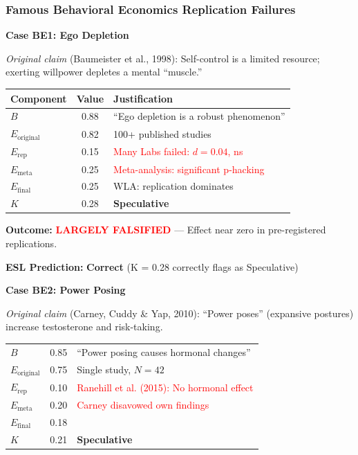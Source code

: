 \documentclass[11pt,a4paper]{article}
\begin{document}
\subsubsection{Famous Behavioral Economics Replication Failures}

\textbf{Case BE1: Ego Depletion}

\textit{Original claim} (Baumeister et al., 1998): Self-control is a limited resource; exerting willpower depletes a mental ``muscle.''

\begin{center}
\begin{tabular}{lcl}
\toprule
\textbf{Component} & \textbf{Value} & \textbf{Justification} \\
\midrule
$B$ & 0.88 & ``Ego depletion is a robust phenomenon'' \\
$E_{\text{original}}$ & 0.82 & 100+ published studies \\
$E_{\text{rep}}$ & 0.15 & \textcolor{red}{Many Labs failed: $d = 0.04$, ns} \\
$E_{\text{meta}}$ & 0.25 & \textcolor{red}{Meta-analysis: significant p-hacking} \\
\midrule
$E_{\text{final}}$ & 0.25 & WLA: replication dominates \\
$K$ & 0.28 & \textbf{Speculative} \\
\bottomrule
\end{tabular}
\end{center}

\textbf{Outcome:} \textcolor{red}{\textbf{LARGELY FALSIFIED}} --- Effect near zero in pre-registered replications.

\textbf{ESL Prediction:} \checkmark \textbf{Correct} (K = 0.28 correctly flags as Speculative)

\vspace{1em}

\textbf{Case BE2: Power Posing}

\textit{Original claim} (Carney, Cuddy \& Yap, 2010): ``Power poses'' (expansive postures) increase testosterone and risk-taking.

\begin{center}
\begin{tabular}{lcl}
\toprule
$B$ & 0.85 & ``Power posing causes hormonal changes'' \\
$E_{\text{original}}$ & 0.75 & Single study, $N = 42$ \\
$E_{\text{rep}}$ & 0.10 & \textcolor{red}{Ranehill et al. (2015): No hormonal effect} \\
$E_{\text{meta}}$ & 0.20 & \textcolor{red}{Carney disavowed own findings} \\
\midrule
$E_{\text{final}}$ & 0.18 & \\
$K$ & 0.21 & \textbf{Speculative} \\
\bottomrule
\end{tabular}
\end{center}
\end{document}
